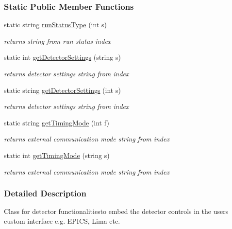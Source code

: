 \subsubsection*{Static Public Member Functions}
\begin{CompactItemize}
\item 
static string \hyperlink{classslsDetectorUsers_2c073513ae3ac53f3e040bc2911b6ee2}{run\-Status\-Type} (int s)
\begin{CompactList}\small\item\em returns string from run status index \item\end{CompactList}\item 
static int \hyperlink{classslsDetectorUsers_7f2e97b2fa0e106b364c9c200a5d74ad}{get\-Detector\-Settings} (string s)
\begin{CompactList}\small\item\em returns detector settings string from index \item\end{CompactList}\item 
static string \hyperlink{classslsDetectorUsers_a66defec09b568a514e57b444dbe0d7f}{get\-Detector\-Settings} (int s)
\begin{CompactList}\small\item\em returns detector settings string from index \item\end{CompactList}\item 
static string \hyperlink{classslsDetectorUsers_420880726f4036bf9da83edfcb2d6cf0}{get\-Timing\-Mode} (int f)
\begin{CompactList}\small\item\em returns external communication mode string from index \item\end{CompactList}\item 
static int \hyperlink{classslsDetectorUsers_e88a9626e4e661c1c0e1d27ba4a57d50}{get\-Timing\-Mode} (string s)
\begin{CompactList}\small\item\em returns external communication mode string from index \item\end{CompactList}\end{CompactItemize}


\subsubsection{Detailed Description}
Class for detector functionalitiesto embed the detector controls in the users custom interface e.g. EPICS, Lima etc. 



